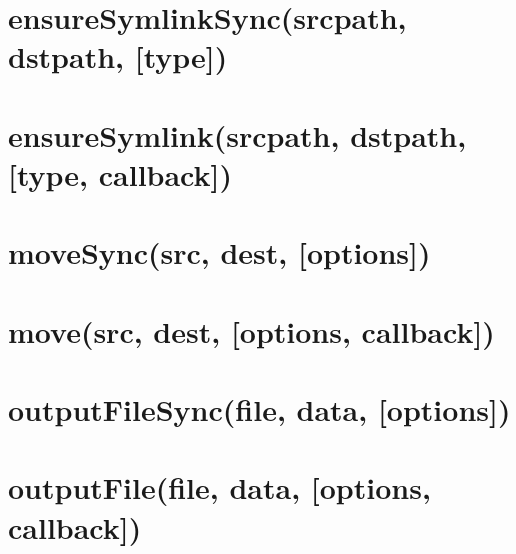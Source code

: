 \documentclass[twoside]{book}
\newcommand{\+}{\discretionary{\mbox{\scriptsize$\hookleftarrow$}}{}{}}
\begin{document}
\chapter{ensure\+Symlink\+Sync(srcpath, dstpath, \mbox{[}type\mbox{]})}
\label{md__c_1_workspace_demo_src_main_script_node_modules_fs-extra_docs_ensure_symlink-sync}

\chapter{ensure\+Symlink(srcpath, dstpath, \mbox{[}type, callback\mbox{]})}
\label{md__c_1_workspace_demo_src_main_script_node_modules_fs-extra_docs_ensure_symlink}

\chapter{move\+Sync(src, dest, \mbox{[}options\mbox{]})}
\label{md__c_1_workspace_demo_src_main_script_node_modules_fs-extra_docs_move-sync}

\chapter{move(src, dest, \mbox{[}options, callback\mbox{]})}
\label{md__c_1_workspace_demo_src_main_script_node_modules_fs-extra_docs_move}

\chapter{output\+File\+Sync(file, data, \mbox{[}options\mbox{]})}
\label{md__c_1_workspace_demo_src_main_script_node_modules_fs-extra_docs_output_file-sync}

\chapter{output\+File(file, data, \mbox{[}options, callback\mbox{]})}
\label{md__c_1_workspace_demo_src_main_script_node_modules_fs-extra_docs_output_file}

\end{document}

